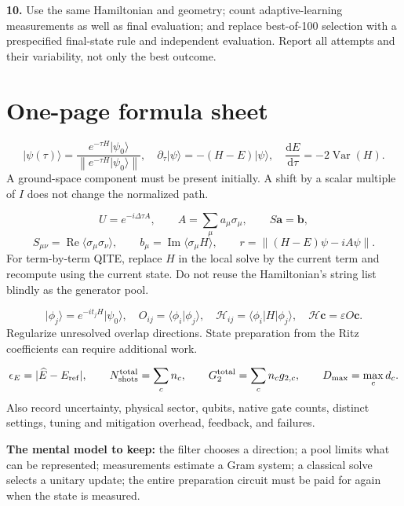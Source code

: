 \documentclass[11pt,a4paper]{article}
\newcommand{\ket}[1]{\lvert #1\rangle}
\newcommand{\bra}[1]{\langle #1\rvert}
\newcommand{\braket}[2]{\langle #1\vert #2\rangle}
\newcommand{\ex}[1]{\langle #1\rangle}
\newcommand{\norm}[1]{\left\lVert #1\right\rVert}
\newcommand{\Var}{\operatorname{Var}}
\newcommand{\Rea}{\operatorname{Re}}
\newcommand{\Ima}{\operatorname{Im}}
\newcommand{\dd}{\mathrm{d}}
\newcommand{\dt}{\Delta\tau}
\newcommand{\lesson}[2]{\clearpage\section{#1}\label{#2}}
\begin{document}
\textbf{10.} Use the same Hamiltonian and geometry; count adaptive-learning measurements as well as final evaluation; and replace best-of-100 selection with a prespecified final-state rule and independent evaluation. Report all attempts and their variability, not only the best outcome.

\lesson{One-page formula sheet}{sec:cheatsheet}
\begin{idea}
\[
\ket{\psi(\tau)}=\frac{e^{-\tau H}\ket{\psi_0}}{\norm{e^{-\tau H}\ket{\psi_0}}},\quad
\partial_\tau\ket{\psi}=-(H-E)\ket{\psi},\quad
\frac{\dd E}{\dd\tau}=-2\Var(H).
\]
A ground-space component must be present initially. A shift by a scalar multiple of $I$ does not change the normalized path.
\end{idea}

\begin{idea}
\[
U=e^{-i\dt A},\qquad A=\sum_\mu a_\mu\sigma_\mu,\qquad
S\bm a=\bm b,
\]
\[
S_{\mu\nu}=\Rea\ex{\sigma_\mu\sigma_\nu},\qquad
b_\mu=\Ima\ex{\sigma_\mu H},\qquad
r=\norm{(H-E)\psi-iA\psi}.
\]
For term-by-term QITE, replace $H$ in the local solve by the current term and recompute using the current state. Do not reuse the Hamiltonian's string list blindly as the generator pool.
\end{idea}

\begin{idea}
\[
\ket{\phi_j}=e^{-it_jH}\ket{\psi_0},\quad
O_{ij}=\braket{\phi_i}{\phi_j},\quad
\mathcal H_{ij}=\bra{\phi_i}H\ket{\phi_j},\quad
\mathcal H\bm c=\varepsilon O\bm c.
\]
Regularize unresolved overlap directions. State preparation from the Ritz coefficients can require additional work.
\end{idea}

\begin{idea}
\[
\epsilon_E=|\widehat E-E_{\rm ref}|,\qquad
N_{\rm shots}^{\rm total}=\sum_c n_c,\qquad
G_2^{\rm total}=\sum_c n_cg_{2,c},\qquad D_{\max}=\max_c d_c.
\]
Also record uncertainty, physical sector, qubits, native gate counts, distinct settings, tuning and mitigation overhead, feedback, and failures.
\end{idea}

\textbf{The mental model to keep:} the filter chooses a direction; a pool limits what can be represented; measurements estimate a Gram system; a classical solve selects a unitary update; the entire preparation circuit must be paid for again when the state is measured.
\end{document}
